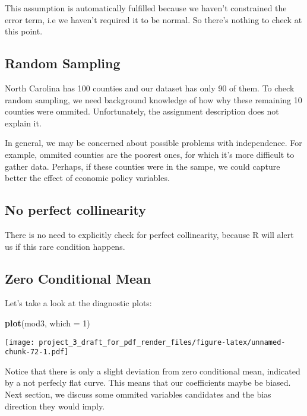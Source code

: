 \documentclass[]{article}
\newenvironment{Shaded}{\begin{snugshade}}{\end{snugshade}}
\newcommand{\DataTypeTok}[1]{\textcolor[rgb]{0.13,0.29,0.53}{#1}}
\newcommand{\DecValTok}[1]{\textcolor[rgb]{0.00,0.00,0.81}{#1}}
\newcommand{\KeywordTok}[1]{\textcolor[rgb]{0.13,0.29,0.53}{\textbf{#1}}}
\newcommand{\NormalTok}[1]{#1}
\begin{document}
This assumption is automatically fulfilled because we haven't
constrained the error term, i.e we haven't required it to be normal. So
there's nothing to check at this point.

\hypertarget{random-sampling}{%
\subsection{Random Sampling}\label{random-sampling}}

North Carolina has 100 counties and our dataset has only 90 of them. To
check random sampling, we need background knowledge of how why these
remaining 10 counties were ommited. Unfortunately, the assignment
description does not explain it.

In general, we may be concerned about possible problems with
independence. For example, ommited counties are the poorest ones, for
which it's more difficult to gather data. Perhaps, if these counties
were in the sampe, we could capture better the effect of economic policy
variables.

\hypertarget{no-perfect-collinearity}{%
\subsection{No perfect collinearity}\label{no-perfect-collinearity}}

There is no need to explicitly check for perfect collinearity, because R
will alert us if this rare condition happens.

\hypertarget{zero-conditional-mean}{%
\subsection{Zero Conditional Mean}\label{zero-conditional-mean}}

Let's take a look at the diagnostic plots:

\begin{Shaded}
\begin{Highlighting}[]
\KeywordTok{plot}\NormalTok{(mod3, }\DataTypeTok{which =} \DecValTok{1}\NormalTok{)}
\end{Highlighting}
\end{Shaded}

\texttt{[image: project\_3\_draft\_for\_pdf\_render\_files/figure-latex/unnamed-chunk-72-1.pdf]}

Notice that there is only a slight deviation from zero conditional mean,
indicated by a not perfecly flat curve. This means that our coefficients
maybe be biased. Next section, we discuss some ommited variables
candidates and the bias direction they would imply.
\end{document}
